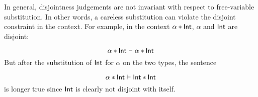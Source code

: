In general, disjointness judgements are not invariant with respect to
free-variable substitution. In other words, a careless substitution can violate
the disjoint constraint in the context. For example, in the context $\alpha
* \textsf{Int}$, $\alpha$ and $\textsf{Int}$ are disjoint:

\[
  \alpha * \textsf{Int} \vdash \alpha * \textsf{Int}
\]
But after the substitution of $\textsf{Int}$ for $\alpha$ on the two types, the sentence

\[
  \alpha * \textsf{Int} \vdash \textsf{Int} * \textsf{Int}
\]
is longer true since $\textsf{Int}$ is clearly not disjoint with itself.

%
%
%

%
%
%
%
%
%
%

